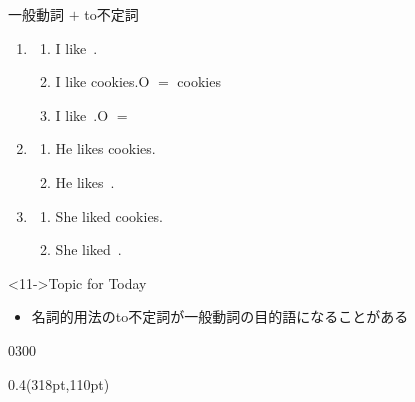 \documentclass[aspectratio=169,xcolor={dvipsnames,table}]{beamer}
\begin{document}
\begin{frame}[plain]{一般動詞 $+$ to不定詞}
\large 

\begin{enumerate}
 \item \begin{enumerate}
	\item<1-> I like \,.%
	\item<2-> I like cookies.\hfill{}O $=$ cookies
	\item<3-> I like \,.\hfill{}O $=$ 
       \end{enumerate}
 \item \begin{enumerate}
	\item<5-> He likes cookies.
	\item<6-> He likes \,.
       \end{enumerate}
 \item \begin{enumerate}
	\item<8-> She liked cookies.
	\item<9-> She liked \,.
       \end{enumerate} 
\end{enumerate}

\vspace*{40pt}

\begin{block}<11->{Topic for Today}
\begin{itemize}[square]\small
 \item<11->   名詞的用法のto不定詞が一般動詞の目的語になることがある
 \end{itemize}
     \end{block}

\vspace{-10pt}

\hfill{\tiny 0300}\,{\scriptsize {}}


\begin{textblock*}{0.4\linewidth}(318pt,110pt)
\end{textblock*}

\end{frame}
\end{document}
